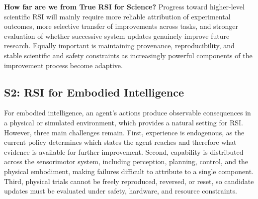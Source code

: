 \begin{tcolorbox}[
    width=\linewidth,
    colback=gray!7,
    colframe=gray!45,
    boxrule=0.9pt,
    arc=2mm,
    outer arc=2mm,
    left=7pt,
    right=7pt,
    top=5pt,
    bottom=5pt,
    boxsep=0pt,
    before skip=5pt,
    after skip=5pt
]
\textbf{How far are we from True RSI for Science?}
Progress toward higher-level scientific RSI will mainly require more reliable attribution of experimental outcomes, more selective transfer of improvements across tasks, and stronger evaluation of whether successive system updates genuinely improve future research. Equally important is maintaining provenance, reproducibility, and stable scientific and safety constraints as increasingly powerful components of the improvement process become adaptive.
\end{tcolorbox}








\subsection{S2: RSI for Embodied Intelligence}
\label{subsec:s2}


For embodied intelligence, an agent's actions produce observable consequences in a physical or simulated environment, which provides a natural setting for RSI.
However, three main challenges remain.
First, experience is endogenous, as the current policy determines which states the agent reaches and therefore what evidence is available for further improvement. 
Second, capability is distributed across the sensorimotor system, including perception, planning, control, and the physical embodiment, making failures difficult to attribute to a single component. 
Third, physical trials cannot be freely reproduced, reversed, or reset, so candidate updates must be evaluated under safety, hardware, and resource constraints. 

